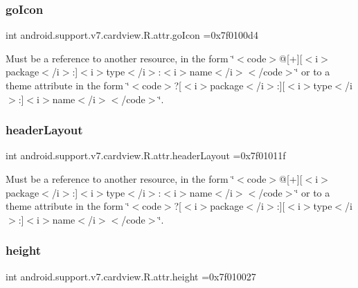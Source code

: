 \subsubsection{\texorpdfstring{go\+Icon}{goIcon}}
{\footnotesize\ttfamily int android.\+support.\+v7.\+cardview.\+R.\+attr.\+go\+Icon =0x7f0100d4\hspace{0.3cm}{\ttfamily [static]}}

Must be a reference to another resource, in the form \char`\"{}$<$code$>$@\mbox{[}+\mbox{]}\mbox{[}$<$i$>$package$<$/i$>$\+:\mbox{]}$<$i$>$type$<$/i$>$\+:$<$i$>$name$<$/i$>$$<$/code$>$\char`\"{} or to a theme attribute in the form \char`\"{}$<$code$>$?\mbox{[}$<$i$>$package$<$/i$>$\+:\mbox{]}\mbox{[}$<$i$>$type$<$/i$>$\+:\mbox{]}$<$i$>$name$<$/i$>$$<$/code$>$\char`\"{}. \mbox{\label{classandroid_1_1support_1_1v7_1_1cardview_1_1R_1_1attr_a16409e04c171c12c016138a8e5b33b47}} 
\subsubsection{\texorpdfstring{header\+Layout}{headerLayout}}
{\footnotesize\ttfamily int android.\+support.\+v7.\+cardview.\+R.\+attr.\+header\+Layout =0x7f01011f\hspace{0.3cm}{\ttfamily [static]}}

Must be a reference to another resource, in the form \char`\"{}$<$code$>$@\mbox{[}+\mbox{]}\mbox{[}$<$i$>$package$<$/i$>$\+:\mbox{]}$<$i$>$type$<$/i$>$\+:$<$i$>$name$<$/i$>$$<$/code$>$\char`\"{} or to a theme attribute in the form \char`\"{}$<$code$>$?\mbox{[}$<$i$>$package$<$/i$>$\+:\mbox{]}\mbox{[}$<$i$>$type$<$/i$>$\+:\mbox{]}$<$i$>$name$<$/i$>$$<$/code$>$\char`\"{}. \mbox{\label{classandroid_1_1support_1_1v7_1_1cardview_1_1R_1_1attr_a52501b26bd9a1de11fdf451397cb630c}} 
\subsubsection{\texorpdfstring{height}{height}}
{\footnotesize\ttfamily int android.\+support.\+v7.\+cardview.\+R.\+attr.\+height =0x7f010027\hspace{0.3cm}{\ttfamily [static]}}

